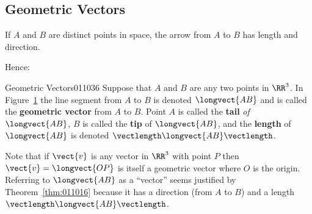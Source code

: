 \subsection*{Geometric Vectors}

If $A$ and $B$ are distinct points in space, the arrow from $A$ to $B$ has length and direction.

\begin{figure}[H]
\centering

\caption{\label{fig:011041}}
\end{figure}


Hence:
\begin{definition}{Geometric Vectors}{011036}
Suppose that $A$ and $B$ are any two points in $\RR^3$. In Figure~\ref{fig:011041} the line segment from $A$ to $B$ is denoted $\longvect{AB}$ and is called the \textbf{geometric vector} from $A$ to $B$. Point $A$ is called the \textbf{tail} \textit{of} $\longvect{AB}$, $B$ is called the \textbf{tip} of $\longvect{AB}$, and the \textbf{length} of $\longvect{AB}$ is denoted $\vectlength \longvect{AB} \vectlength$.
\end{definition}

Note that if $\vect{v}$ is any vector in $\RR^3$ with point $P$ then $\vect{v} = \longvect{OP}$ is itself a geometric vector where $O$ is the origin. Referring to $\longvect{AB}$  as a ``vector'' seems justified by Theorem~\ref{thm:011016} because it has a direction (from $A$ to $B$) and a length $\vectlength \longvect{AB} \vectlength$.

\begin{wrapfigure}{lL}{5cm} 
\centering

\caption{\label{fig:011048}}
\end{wrapfigure}

